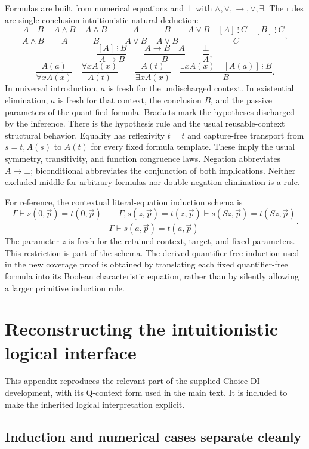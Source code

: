 \documentclass[11pt]{article}
\theoremstyle{definition}\newtheorem{definition}[theorem]{Definition}
\begin{document}
Formulas are built from numerical equations and $\bot$ with
$\wedge,\vee,\to,\forall,\exists$. The rules are single-conclusion
intuitionistic natural deduction:
\[
\frac{A\quad B}{A\wedge B}\quad
\frac{A\wedge B}{A}\quad\frac{A\wedge B}{B}\qquad
\frac{A}{A\vee B}\quad\frac{B}{A\vee B}\quad
\frac{A\vee B\quad[A]\ \vdots\ C\quad[B]\ \vdots\ C}{C},
\]
\[
\frac{[A]\ \vdots\ B}{A\to B}\qquad
\frac{A\to B\quad A}{B}\qquad
\frac{\bot}{A},
\]
\[
\frac{A(a)}{\forall xA(x)}\quad
\frac{\forall xA(x)}{A(t)}\qquad
\frac{A(t)}{\exists xA(x)}\quad
\frac{\exists xA(x)\quad[A(a)]\ \vdots\ B}{B}.
\]
In universal introduction, $a$ is fresh for the undischarged context.
In existential elimination, $a$ is fresh for that context, the conclusion
$B$, and the passive parameters of the quantified formula. Brackets
mark the hypotheses discharged by the inference. There is the hypothesis
rule and the usual reusable-context structural behavior. Equality has
reflexivity $t=t$ and capture-free transport from $s=t,A(s)$ to $A(t)$
for every fixed formula template. These imply the usual symmetry,
transitivity, and function congruence laws. Negation abbreviates
$A\to\bot$; biconditional abbreviates the conjunction of both implications.
Neither excluded middle for arbitrary formulas nor double-negation
elimination is a rule.

For reference, the contextual literal-equation induction schema is
\[
\frac{\Gamma\vdash s(0,\vec p)=t(0,\vec p)\qquad
 \Gamma,s(z,\vec p)=t(z,\vec p)\vdash s(Sz,\vec p)=t(Sz,\vec p)}
 {\Gamma\vdash s(a,\vec p)=t(a,\vec p)}.
\]
The parameter $z$ is fresh for the retained context, target, and fixed
parameters. This restriction is part of the schema. The derived
quantifier-free induction used in the new coverage proof is obtained
by translating each fixed quantifier-free formula into its Boolean
characteristic equation, rather than by silently allowing a larger
primitive induction rule.

\section{Reconstructing the intuitionistic logical interface}
\label{sec:choice-introduction}
This appendix reproduces the relevant part of the supplied Choice-DI development, with its Q-context form used in the main text. It is included to make the inherited logical interpretation explicit.\cite{source}

\subsection{Induction and numerical cases separate cleanly}
\end{document}
